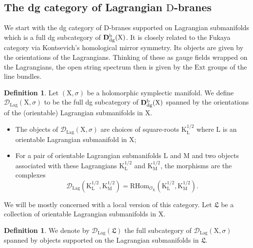 \documentclass{article}
\theoremstyle{plain}
\theoremstyle{definition}
\newtheorem{definition}[theorem]{Definition}
\theoremstyle{remark}
\newcommand{\Db}{{\mathrm{\bf{D}}}^{\mr{b}}}
\newcommand{\mr}{\mathrm}
\newcommand{\3}{\vspace{3mm}}
\newcommand{\2}{\vspace{2mm}}
\newcommand{\1}{\vspace{1mm}}
\begin{document}
\subsection{The dg category of Lagrangian \texorpdfstring{$\mr{D}$}--branes}
We start with the dg category of $\mr{D}$-branes supported on Lagrangian submanifolds which is a full dg subcategory of $\Db_{\mr{dg}}(\mr{X})$. It is closely related to the Fukaya category via Kontsevich's homological mirror symmetry. Its objects are given by the orientations of the Lagrangians. Thinking of these as gauge fields wrapped on the Lagrangians, the open string spectrum then is given by the $\mr{Ext}$ groups of the line bundles. 
\2
\begin{definition}
Let $(\mr{X},\sigma)$ be a holomorphic symplectic manifold. We define $\mathcal{D}_\mr{Lag}(\mr{X},\sigma)$ to be the full dg subcategory of $\Db_\mr{dg}(\mr{X})$ spanned by the orientations of the (orientable) Lagrangian submanifolds in $\mr{X}$. 
\end{definition}
\2
\begin{itemize}
\item The objects of $\mathcal{D}_\mr{Lag}(\mr{X},\sigma)$ are choices of square-roots $\mr{K}_\mr{L}^{1/2}$ where $\mr{L}$ is an orientable Lagrangian submanifold in $\mr{X}$;
\item For a pair of orientable Lagrangian submanifolds $\mr{L}$ and $\mr{M}$ and two objects associated with these Lagrangians $\mr{K}_\mr{L}^{1/2}$ and $\mr{K}_\mr{M}^{1/2}$, the morphisms are the complexes $$\mathcal{D}_\mr{Lag}\left(\mr{K}_\mr{L}^{1/2},\mr{K}_\mr{M}^{1/2}\right)=\mr{RHom}_{\mathscr{O}_\mr{X}}\left(\mr{K}_\mr{L}^{1/2},\mr{K}_\mr{M}^{1/2}\right).$$
\end{itemize}
We will be mostly concerned with a local version of this category. Let $\mathfrak{L}$ be a collection of orientable Lagrangian submanifolds in $\mr{X}$. 
\2
\begin{definition}
We denote by $\mathcal{D}_\mr{Lag}(\mathfrak{L})$ the full subcategory of $\mathcal{D}_\mr{Lag}(\mr{X},\sigma)$ spanned by objects supported on the Lagrangian submanifolds in $\mathfrak{L}$.
\end{definition}
\end{document}
